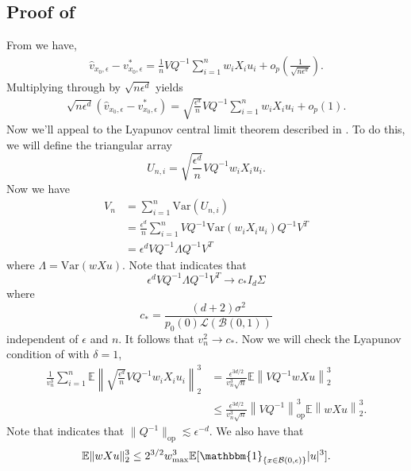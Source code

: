 \documentclass[11pt]{article}
\begin{document}
\subsection{Proof of } \label{sec: proof of central limit for v}
From  we have, 
\begin{align*}
    \hat{v}_{x_0, \epsilon} - v^*_{x_0, \epsilon} = \frac{1}{n}VQ^{-1}\sum_{i = 1}^nw_iX_iu_i 
    + o_p\left(\frac{1}{\sqrt{n\epsilon^d}}\right).
\end{align*}
Multiplying through by $\sqrt{n\epsilon^{d}}$ yields
\begin{align*}
    \sqrt{n\epsilon^{d}}(\hat{v}_{x_0, \epsilon} - v^*_{x_0, \epsilon}) = \sqrt{\frac{\epsilon^{d}}{n}}VQ^{-1}\sum_{i = 1}^nw_iX_iu_i 
    + o_p\left(1\right).
\end{align*}
Now we'll appeal to the Lyapunov central limit theorem described in . To do this, we will define the triangular array
\[U_{n, i} = \sqrt{\frac{\epsilon^{d}}{n}}VQ^{-1}w_iX_iu_i.\]
Now we have
\begin{align*}
    V_n &= \sum_{i = 1}^n\text{Var}(U_{n, i}) \\
    &= \frac{\epsilon^d}{n}\sum_{i = 1}^nVQ^{-1}\text{Var}(w_iX_iu_i)Q^{-1}V^T \tag{independence} \\
    &= \epsilon^dVQ^{-1}\Lambda Q^{-1}V^T \tag{identically distributed for fixed $n$}
\end{align*}
where $\Lambda = \text{Var}(wXu)$. Note that  indicates that
\[\epsilon^dVQ^{-1}\Lambda Q^{-1}V^T \rightarrow  c_*I_d \Sigma\]
where
\[c_* = \frac{(d+2)\sigma^2}{p_0(0)\mathcal{L}(\mathcal{B}(0,1))}\]
independent of $\epsilon$ and $n$. It follows that $v_n^2 \rightarrow c_*$. Now we will check the Lyapunov condition of  with $\delta = 1$,
\begin{align*}
     \frac{1}{v_n^{3}}\sum_{i = 1}^n\mathbb{E}\left\|\sqrt{\frac{\epsilon^{d}}{n}}VQ^{-1}w_iX_iu_i\right\|_2^3 &= \frac{\epsilon^{3d/2}}{v_n^3\sqrt{n}}\mathbb{E}\left\|VQ^{-1}wXu\right\|_2^3 \\
     &\leq \frac{\epsilon^{3d/2}}{v_n^3\sqrt{n}}\left\|VQ^{-1}\right\|_{\text{op}}^3\mathbb{E}\left\|wXu\right\|_2^3.
\end{align*}
Note that  indicates that $\|Q^{-1}\|_{\text{op}} \lesssim \epsilon^{-d}$. We also have that 
\[\mathbb{E}\|wXu\|_2^3 \leq 2^{3/2}w^3_{\max}\mathbb{E}[\mathbbm{1}_{\{x \in \mathcal{B}(0, \epsilon)\}}|u|^3].\] 
\end{document}
